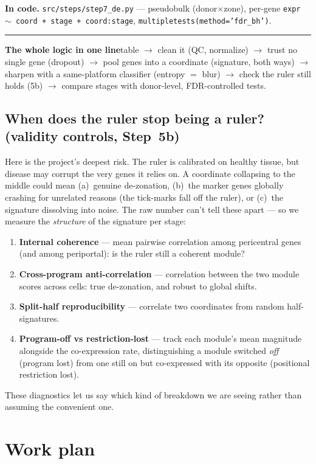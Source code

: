 \documentclass[11pt]{article}
\newcommand{\aside}[2]{\par\medskip\noindent\textcolor{teal0}{\rule{2pt}{\baselineskip}}\quad\textbf{\textcolor{teal0}{#1}}\quad #2\par\medskip}
\newcommand{\code}[1]{\texttt{#1}}
\begin{document}
\noindent\textbf{In code.} \code{src/steps/step7\_de.py} --- pseudobulk (donor$\times$zone), per-gene
\code{expr $\sim$ coord + stage + coord:stage}, \code{multipletests(method='fdr\_bh')}.

\aside{The whole logic in one line}{table $\to$ clean it (QC, normalize) $\to$ trust no single gene
(dropout) $\to$ pool genes into a coordinate (signature, both ways) $\to$ sharpen with a same-platform
classifier (entropy $=$ blur) $\to$ check the ruler still holds (5b) $\to$ compare stages with
donor-level, FDR-controlled tests.}

\subsection{When does the ruler stop being a ruler? (validity controls, Step~5b)}
\label{sec:rulervalid}

Here is the project's deepest risk. The ruler is calibrated on healthy tissue, but disease may corrupt
the very genes it relies on. A coordinate collapsing to the middle could mean (a)~genuine de-zonation,
(b)~the marker genes globally crashing for unrelated reasons (the tick-marks fall off the ruler), or
(c)~the signature dissolving into noise. The raw number can't tell these apart --- so we measure the
\emph{structure} of the signature per stage:
\begin{enumerate}[leftmargin=1.6em]
\item \textbf{Internal coherence} --- mean pairwise correlation among pericentral genes (and among
periportal): is the ruler still a coherent module?
\item \textbf{Cross-program anti-correlation} --- correlation between the two module scores across
cells: true de-zonation, and robust to global shifts.
\item \textbf{Split-half reproducibility} --- correlate two coordinates from random half-signatures.
\item \textbf{Program-off vs restriction-lost} --- track each module's mean magnitude alongside the
co-expression rate, distinguishing a module switched \emph{off} (program lost) from one still on but
co-expressed with its opposite (positional restriction lost).
\end{enumerate}
These diagnostics let us say which kind of breakdown we are seeing rather than assuming the convenient
one.

\clearpage
\section{Work plan}
\label{sec:workplan}
\end{document}
